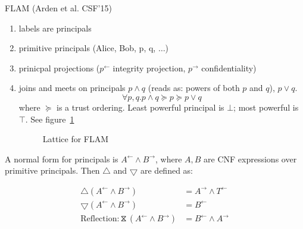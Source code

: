 \documentclass{article}
\newcommand{\la}{^{\leftarrow}}
\newcommand{\ra}{^{\rightarrow}}
\newcommand{\refl}{\hourglass}
\begin{document}
FLAM (Arden et al. CSF'15)
\begin{enumerate}
    \item labels are principals
    \item primitive principals (Alice, Bob, p, q, $\ldots$)
    \item prinicpal projections ($p^{\leftarrow}$ integrity projection, $p^{\rightarrow}$ confidentiality)
    \item joins and meets on principals $p \land q$ (reads as: powers of both $p$ and $q$), $p \lor q$.
      \begin{equation*}
        \forall p,q. p \land q \succeq p \succeq p \lor q
      \end{equation*}
where $\succeq$ is a trust ordering. Least powerful principal is $\bot$; most powerful is $\top$. See figure~\ref{fig3}
\begin{figure}[ht!]
\label{fig3}
\caption{Lattice for FLAM}
\end{figure}
\end{enumerate}

A normal form for principals is $A^{\leftarrow} \land B^{\rightarrow}$, where $A,B$ are CNF expressions over primitive principals. Then $\bigtriangleup$ and $\bigtriangledown$ are defined as:

\begin{align*}
  \bigtriangleup (A \la \land B \ra) &= A \ra \land T \la \\
  \bigtriangledown (A \la \land B \ra) &= B \la \\
  \text{Reflection:} \refl (A \la \land B \ra) &= B \la \land A \ra                                         
\end{align*}
\end{document}
